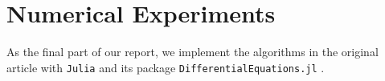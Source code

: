 \section{Numerical Experiments}
As the final part of our report, we implement the algorithms in the original article with \texttt{Julia} and its package \texttt{DifferentialEquations.jl} \cite{rackauckas2017differentialequations}.